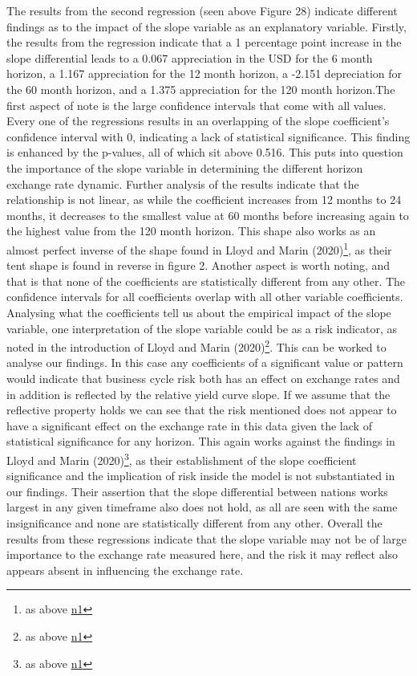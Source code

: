 \documentclass[10pt]{article}
\begin{document}
The results from the second regression (seen above Figure 28) indicate different findings as to the impact of the slope variable as an explanatory variable. Firstly, the results from the regression indicate that a 1 percentage point increase in the slope differential leads to a 0.067 appreciation in the USD for the 6 month horizon, a 1.167 appreciation for the 12 month horizon, a -2.151 depreciation for the 60 month horizon, and a 1.375 appreciation for the 120 month horizon.The first aspect of note is the large confidence intervals that come with all values. Every one of the regressions results in an overlapping of the slope coefficient’s confidence interval with 0, indicating a lack of statistical significance. This finding is enhanced by the p-values, all of which sit above 0.516. This puts into question the importance of the slope variable in determining the different horizon exchange rate dynamic.  Further analysis of the results indicate that the relationship is not linear, as while the coefficient increases from 12 months to 24 months, it decreases to the smallest value at 60 months before increasing again to the highest value from the 120 month horizon. This shape also works as an almost perfect inverse of the shape found in Lloyd and Marin (2020)\footnote{as above \hyperref[lloyd2020exchange]{n1}}, as their tent shape is found in reverse in figure 2. Another aspect is worth noting, and that is that none of the coefficients are statistically different from any other. The confidence intervals for all coefficients overlap with all other variable coefficients. Analysing what the coefficients tell us about the empirical impact of the slope variable, one interpretation of the slope variable could be as a risk indicator, as noted in the introduction of Lloyd and Marin (2020)\footnote{as above \hyperref[lloyd2020exchange]{n1}}. This can be worked to analyse our findings. In this case any coefficients of a significant value or pattern would indicate that business cycle risk both has an effect on exchange rates and in addition is reflected by the relative yield curve slope. If we assume that the reflective property holds we can see that the risk mentioned does not appear to have a significant effect on the exchange rate in this data given the lack of statistical significance for any horizon. This again works against the findings in Lloyd and Marin (2020)\footnote{as above \hyperref[lloyd2020exchange]{n1}}, as their establishment of the slope coefficient significance and the implication of risk inside the model is not substantiated in our findings. Their assertion that the slope differential between nations works largest in any given timeframe also does not hold, as all are seen with the same insignificance and none are statistically different from any other. Overall the results from these regressions indicate that the slope variable may not be of large importance to the exchange rate measured here, and the risk it may reflect also appears absent in influencing the exchange rate.
\end{document}
